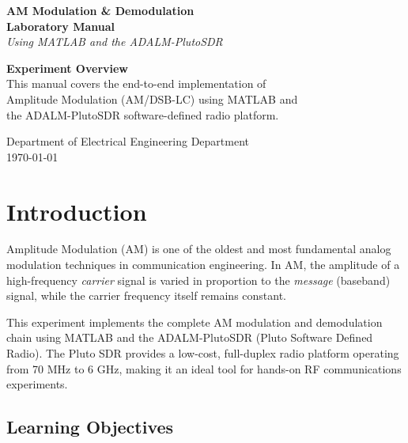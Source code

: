 \documentclass[12pt,a4paper]{article}
\begin{document}
\begin{titlepage}
  \centering
  \vspace*{2cm}
  {\Huge\bfseries\color{blue!70!black} AM Modulation \& Demodulation\\[0.4em]
   \large Laboratory Manual}\\[1.5cm]
  {\large\itshape Using MATLAB and the ADALM-PlutoSDR}\\[3cm]

  \begin{mdframed}[linecolor=blue!50,linewidth=1.5pt,roundcorner=8pt,backgroundcolor=blue!5]
    \centering\large
    \textbf{Experiment Overview}\\[0.5em]
    This manual covers the end-to-end implementation of\\
    Amplitude Modulation (AM/DSB-LC) using MATLAB and\\
    the ADALM-PlutoSDR software-defined radio platform.
  \end{mdframed}

  \vfill
  {\large Department of Electrical Engineering Department}\\[0.3em]
  {\large\today}
\end{titlepage}

\tableofcontents
\newpage

\section{Introduction}

Amplitude Modulation (AM) is one of the oldest and most fundamental analog
modulation techniques in communication engineering. In AM, the amplitude of a
high-frequency \emph{carrier} signal is varied in proportion to the
\emph{message} (baseband) signal, while the carrier frequency itself remains
constant.

This experiment implements the complete AM modulation and demodulation chain
using MATLAB and the ADALM-PlutoSDR (Pluto Software Defined Radio). The Pluto
SDR provides a low-cost, full-duplex radio platform operating from 70 MHz to
6 GHz, making it an ideal tool for hands-on RF communications experiments.

\subsection{Learning Objectives}
\end{document}
